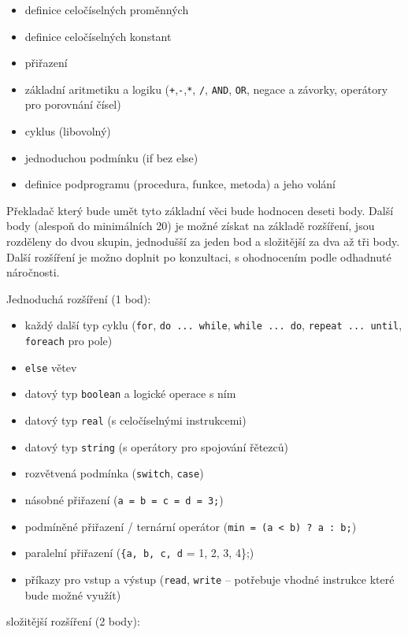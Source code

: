 \documentclass[a4paper]{article}
\begin{document}
\begin{itemize}
\item definice celo\v{c}\'iseln\'ych prom\v{e}nn\'ych
\item definice celo\v{c}\'iseln\'ych konstant
\item p\v{r}i\v{r}azen\'i
\item z\'akladn\'i aritmetiku a logiku (\texttt{+},\texttt{-},\texttt{*},
	\texttt{/}, \texttt{AND}, \texttt{OR}, negace a z\'avorky,
	oper\'atory pro porovn\'an\'i \v{c}\'isel)
\item cyklus (libovoln\'y)
\item jednoduchou podm\'inku (if bez else)
\item definice podprogramu (procedura, funkce, metoda) a jeho vol\'an\'i
\end{itemize}
P\v{r}eklada\v{c} kter\'y bude um\v{e}t tyto z\'akladn\'i v\v{e}ci bude hodnocen
deseti body. Dal\v{s}\'i body (alespo\v{n} do minim\'aln\'ich 20) je mo\v{z}n\'e
z\'iskat na z\'aklad\v{e} roz\v{s}\'i\v{r}en\'i, jsou rozd\v{e}leny do dvou
skupin, jednodu\v{s}\v{s}\'i za jeden bod a slo\v{z}it\v{e}j\v{s}\'i za dva
a\v{z} t\v{r}i body. Dal\v{s}\'i roz\v{s}\'i\v{r}en\'i je mo\v{z}no doplnit po
konzultaci, s ohodnocen\'im podle odhadnut\'e n\'aro\v{c}nosti. 

Jednoduch\'a roz\v{s}\'i\v{r}en\'i (1 bod):

\begin{itemize}
\item ka\v{z}d\'y dal\v{s}\'i typ cyklu (\texttt{for}, \texttt{do ... while},
	\texttt{while ... do}, \texttt{repeat ... until}, \texttt{foreach} pro pole)
\item \texttt{else} v\v{e}tev
\item datov\'y typ \texttt{boolean} a logick\'e operace s n\'im
\item datov\'y typ \texttt{real} (s celo\v{c}\'iseln\'ymi instrukcemi)
\item datov\'y typ \texttt{string} (s oper\'atory pro spojov\'an\'i
	\v{r}\v{e}tezc\r{u})
\item rozv\v{e}tven\'a podm\'inka (\texttt{switch}, \texttt{case})
\item n\'asobn\'e p\v{r}i\v{r}azen\'i (\texttt{a = b = c = d = 3;})
\item podm\'in\v{e}n\'e p\v{r}i\v{r}azen\'i / tern\'arn\'i oper\'ator
	(\texttt{min = (a < b) ? a : b;})
\item paraleln\'i p\v{r}i\v{r}azen\'i (\texttt{\{a, b, c, d} = {1, 2, 3, 4\};})
\item p\v{r}\'ikazy pro vstup a v\'ystup (\texttt{read}, \texttt{write} --
	pot\v{r}ebuje vhodn\'e instrukce kter\'e bude mo\v{z}n\'e vyu\v{z}\'it)
\end{itemize}
\clearpage
slo\v{z}it\v{e}j\v{s}\'i roz\v{s}\'i\v{r}en\'i (2 body):
\end{document}
